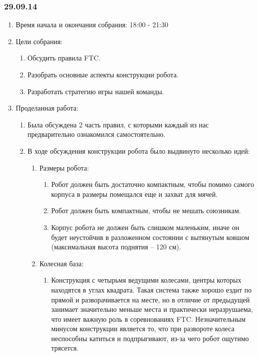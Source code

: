 	
\subsubsection{29.09.14}

\begin{enumerate}
	\item Время начала и окончания собрания:
	18:00 - 21:30
	\item Цели собрания:
	\begin{enumerate}
	  \item Обсудить правила FTC.
	  
	  \item Разобрать основные аспекты конструкции робота.
	  
      \item Разработать стратегию игры нашей команды.
    \end{enumerate}
	\item Проделанная работа:
	\begin{enumerate}
	  \item Была обсуждена 2 часть правил, с которыми каждый из нас предварительно ознакомился самостоятельно.
	  
	  \item В ходе обсуждения конструкции робота было выдвинуто несколько идей:
	  \begin{enumerate}
	    \item Размеры робота:
	    \begin{enumerate}
	      \item Робот должен быть достаточно компактным, чтобы помимо самого корпуса в размеры помещался еще и захват для мячей.
	      
	      \item Робот должен быть компактным, чтобы не мешать союзникам.
	      
	      \item Корпус робота не должен быть слишком маленьким, иначе он будет неустойчив в разложенном состоянии с вытянутым ковшом (максимальная высота поднятия – 120 см).
	      
	    \end{enumerate}
	    
	    \item Колесная база:
	    \begin{enumerate}
	      \item Конструкция с четырьмя ведущими колесами, центры которых находятся в углах квадрата. Такая система также хорошо ездит по прямой и разворачивается на месте, но в отличие от предыдущей занимает значительно меньше места и практически неразрушаема, что имеет важную роль в соревнованиях FTC. Незначительным минусом конструкции является то, что при развороте колеса неспособны катиться и подпрыгивают, из-за чего робот ощутимо трясется.	
	      

\end{enumerate}
\end{enumerate}
\end{enumerate}
\end{enumerate}
